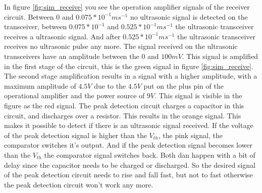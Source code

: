 In figure \ref{fig:sim_receive} you see the operation amplifier signals of the receiver circuit. Between 0 and $0.075*10^{-1}ms^{-1}$ no ultrasonic signal is detected on the transceiver, between $0.075*10^{-1}$ and $0.525*10^{-1}ms^{-1}$ the ultrasonic transceiver receives a ultrasonic signal. And after $0.525*10^{-1}ms^{-1}$ the ultrasonic transceiver receives no ultrasonic pulse any more.
The signal received on the ultrasonic transceivers have an amplitude between the 0 and $100mV$. This signal is amplified in the first stage of the circuit, this is the green signal in figure \ref{fig:sim_receive}. The second stage amplification results in a signal with a higher amplitude, with a maximum amplitude of $4.5V$ due to the $4.5V$ put on the plus pin of the operational amplifier and the power source of $9V$. This signal is visible in the figure as the red signal.
The peak detection circuit charges a capacitor in this circuit, and discharges over a resistor. This results in the orange signal. This makes it possible to detect if there is an ultrasonic signal received. If the voltage of the peak detection signal is higher than the $V_{th}$, the pink signal, the comparator switches it's output. And if the peak detection signal becomes lower than the $V_{th}$ the comparator signal switches back. Both dan happen with a bit of delay since the capacitor needs to be charged or discharged. So the desired signal of the peak detection circuit needs to rise and fall fast, but not to fast otherwise the peak detection circuit won't work any more.\\


